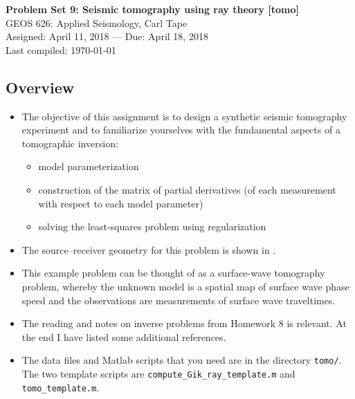 \documentclass[11pt,titlepage,fleqn]{article}
\begin{document}

\begin{spacing}{1.2}
\centering
{\large \bf Problem Set 9: Seismic tomography using ray theory [tomo]} \\
GEOS 626: Applied Seismology, Carl Tape \\
Assigned: April 11, 2018 --- Due: April 18, 2018 \\
Last compiled: \today
\end{spacing}


\subsection*{Overview}

\begin{itemize}
\item The objective of this assignment is to design a synthetic seismic tomography experiment and to familiarize yourselves with the fundamental aspects of a tomographic inversion:
%
\begin{itemize}
\item model parameterization
\item construction of the matrix of partial derivatives (of each measurement with respect to each model parameter)
\item solving the least-squares problem using regularization
\end{itemize}

\item The source--receiver geometry for this problem is shown in .

\item This example problem can be thought of as a surface-wave tomography problem, whereby the unknown model is a spatial map of surface wave phase speed and the observations are measurements of surface wave traveltimes.

\item The reading and notes on inverse problems from Homework 8 is relevant.
At the end I have listed some additional references.
\nocite{Tape2007,Menke,AsterE2,Tarantola2005}

\item 
The data files and Matlab scripts that you need are in the directory \verb+tomo/+. \\
The two template scripts are \verb+compute_Gik_ray_template.m+ and \verb+tomo_template.m+.

\end{itemize}
\end{document}
